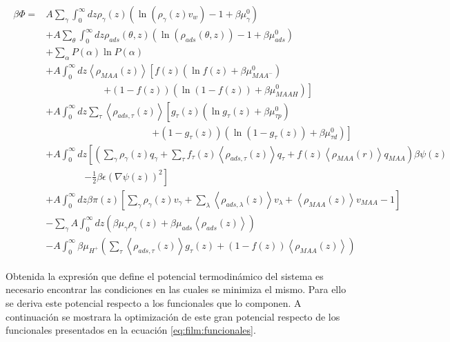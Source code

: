 \begin{align}
	\begin{aligned}
		\beta \Phi=  & A\sum_{\gamma}\int_0^\infty{dz\rho_\gamma(z)\left(\ln \left(\rho_\gamma (z)v_w\right) -1 + \beta\mu^0_\gamma\right)} \\
		&+ A\sum_{\theta}\int_0^\infty{dz\rho_{ads}(\theta,z)\left(\ln \left(\rho_{ads}(\theta,z)\right) -1 + \beta\mu^0_{ads} \right)} \\
		&+ \sum_\alpha{P(\alpha)\ln P(\alpha)} \\
		& + A\int_0^\infty dz \left<\rho_{MAA}(z)\right> \left[f(z)(\ln f(z)+ \beta\mu^0_{MAA^-})\right.\\
		& \qquad\qquad\qquad \left.+(1-f(z))(\ln (1-f(z))+\beta\mu^0_{MAAH})\right] \\
		& + A\int_0^\infty dz \sum_\tau \left<\rho_{ads,\tau}(z)\right> \left[g_\tau(z)(\ln g_\tau(z)+ \beta\mu^0_{\tau p})\right.\\
		&\qquad \qquad \qquad\qquad \qquad\quad \left.+(1-g_\tau(z))(\ln (1-g_\tau(z))+\beta\mu^0_{\tau d})\right]   \\
		& +A\int_0^\infty dz \left[\left(\sum_{\gamma } {\rho_\gamma(z) q_\gamma + \sum_\tau{f_\tau(z) \left<\rho_{ads,\tau}(z)\right> q_\tau} +  f(z) \left<\rho_{MAA}(r)\right>q_{MAA}}\right)\beta\psi(z) \right. \\ & \qquad \qquad \left.-\frac{1}{2}\beta\epsilon(\nabla\psi(z))^2 \right] \\ 
		& +A \int_0^\infty dz\beta\pi(z){\left[\sum_{\gamma}\rho_\gamma(z) v_\gamma + \sum_\lambda{\left<\rho_{ads,\lambda}(z)\right>v_\lambda} + \left<\rho_{MAA}(z)\right>v_{MAA} -1 \right]} \\
		&   -\sum_\gamma A\int_0^\infty dz \left(\beta \mu_\gamma \rho_\gamma(z) + \beta \mu_{ads} \left<\rho_{ads}(z)\right> \right)  \\
		&  -A\int_0^\infty \beta\mu_{H^+} \left( \sum_\tau\left< \rho_{ads,\tau}(z) \right>g_\tau(z) + (1-f(z)) \left< \rho_{MAA}(z) \right> \right )
	\end{aligned}
\end{align}
 
Obtenida la expresi\'on que define el potencial termodin\'amico del sistema es necesario encontrar las condiciones en las cuales se minimiza el mismo. Para ello se deriva este potencial respecto a los funcionales que lo componen.
A continuaci\'on se mostrara la optimizaci\'on de este gran potencial respecto de los funcionales presentados en la  ecuaci\'on \ref{eq:film:funcionales}.

